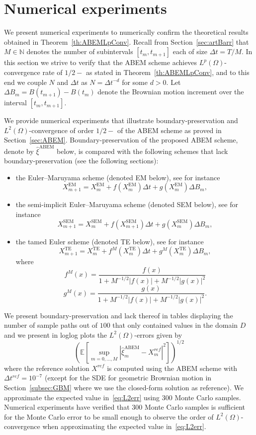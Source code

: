 \documentclass[11pt]{amsart}
\newcommand{\E}{{\mathbb E}}
\newcommand{\EM}{\textrm{EM}}
\newcommand{\SEM}{\textrm{SEM}}
\newcommand{\TE}{\textrm{TE}}
\newcommand{\ABEM}{\textrm{ABEM}}
\begin{document}
{\section{Numerical experiments}\label{sec:numExp}
We present numerical experiments to numerically confirm the theoretical results obtained in Theorem~\ref{th:ABEMLpConv}. Recall from Section~\ref{sec:artBarr} that $M \in \mathbb{N}$ denotes the number of subintervals $[t_{m},t_{m+1}]$ each of size $\Delta t = T/M$. In this section we strive to verify that the ABEM scheme achieves $L^{p}(\Omega)$-convergence rate of $1/2-$ as stated in Theorem~\ref{th:ABEMLpConv}, and to this end we couple $N$ and $\Delta t$ as $N = \Delta t^{-d}$ for some $d>0$. Let $\Delta B_{m} = B(t_{m+1}) - B(t_{m})$ denote the Brownian motion increment over the interval $[t_{m},t_{m+1}]$. 

We provide numerical experiments that illustrate boundary-preservation and $L^{2}(\Omega)$-convergence of order $1/2-$ of the ABEM scheme as proved in Section~\ref{sec:ABEM}. Boundary-preservation of the proposed ABEM scheme, denote by $\hat{\xi}^{\ABEM}$ below, is compared with the following schemes that lack boundary-preservation (see the following sections):
\begin{itemize}
\item the Euler--Maruyama scheme (denoted EM below), see for instance \cite{MR1214374}
$$
X^{\EM}_{m+1}=X^{\EM}_m+ f(X^{\EM}_{m})\Delta t + g(X^{\EM}_m) \Delta B_{m},
$$
\item the semi-implicit Euler--Maruyama scheme (denoted SEM below), see for instance \cite{MR1214374}
$$
X^{\SEM}_{m+1}=X^{\SEM}_m+ f(X^{\SEM}_{m+1})\Delta t + g(X^{\SEM}_m) \Delta B_{m},
$$
\item the tamed Euler scheme (denoted TE below), see for instance \cite{MR2985171, MR3543890}
$$
X^{\TE}_{m+1}=X^{\TE}_m+ f^{M}(X^{\TE}_{m})\Delta t + g^{M}(X^{\TE}_m) \Delta B_{m},
$$
where
$$
f^{M}(x) = \frac{f(x)}{1 + M^{-1/2} |f(x)| + M^{-1/2} | g(x)|^{2}}
$$
$$
g^{M}(x) = \frac{g(x)}{1 + M^{-1/2} |f(x)| + M^{-1/2} | g(x)|^{2}}.
$$
\end{itemize}
We present boundary-preservation and lack thereof in tables displaying the number of sample paths out of $100$ that only contained values in the domain $D$ and we present in loglog plots the $L^{2}(\Omega)$-errors given by
\begin{equation}\label{eq:L2err}
\left( \E \left[ \sup_{m=0,\ldots,M} |\hat{\xi}^{\ABEM}_{m} - X^{ref}_{m}|^{2} \right] \right)^{1/2}
\end{equation}
where the reference solution $X^{ref}$ is computed using the ABEM scheme with $\Delta t^{ref} = 10^{-7}$ (except for the SDE for geometric Brownian motion in Section~\ref{subsec:GBM} where we use the closed-form solution as reference). We approximate the expected value in~\eqref{eq:L2err} using $300$ Monte Carlo samples. Numerical experiments have verified that $300$ Monte Carlo samples is sufficient for the Monte Carlo error to be small enough to observe the order of $L^{2}(\Omega)$-convergence when approximating the expected value in~\eqref{eq:L2err}.

}
\end{document}
